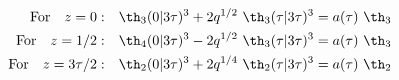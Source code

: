 \begin{equation}
  \begin{split}
 {\rm For} \quad z=0: &\quad \th_3(0|3\tau)^3 + 2q^{1/2} ~\th_3(\tau |3\tau)^3
 = a(\tau) ~\th_3 \\
 {\rm For} \quad z=1/2:& \quad \th_4(0|3\tau)^3 - 2q^{1/2} ~\th_3(\tau |3\tau)^3
 = a(\tau) ~\th_3 \\
 {\rm For} \quad z=3\tau/2: &\quad \th_2(0|3\tau)^3 + 2q^{1/4}
 ~\th_2(\tau|3\tau)^3 = a(\tau) ~\th_2 
  \end{split}
  \end{equation}

